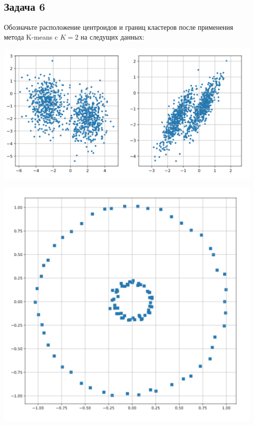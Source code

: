 \documentclass[12pt, a4paper, oneside]{article}
\begin{document}
\subsection*{Задача 6} 

Обозначьте расположение центроидов и границ кластеров после применения метода K-means c $K=2$ на следущих данных: 

\begin{center}
 \includegraphics[scale=0.2]{clouds.png}
\end{center}

\begin{center}
	\includegraphics[scale=0.17]{circles.png}
\end{center}
\end{document}
